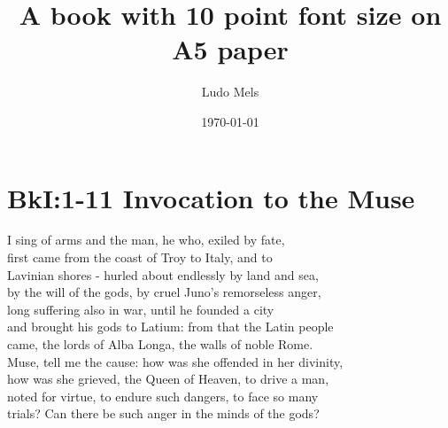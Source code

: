 \documentclass[10pt, a5paper, titlepage]{book}
\title{A book with 10 point font size on A5 paper}
\author{Ludo Mels}
\date{\today}
\begin{document}
\maketitle
\newpage
\section*{BkI:1-11 Invocation to the Muse}
I sing of arms and the man, he who, exiled by fate,\\
first came from the coast of Troy to Italy, and to\\
Lavinian shores - hurled about endlessly by land and sea,\\
by the will of the gods, by cruel Juno's remorseless anger,\\
long suffering also in war, until he founded a city\\
and brought his gods to Latium: from that the Latin people\\
came, the lords of Alba Longa, the walls of noble Rome.\\
Muse, tell me the cause: how was she offended in her divinity,\\
how was she grieved, the Queen of Heaven, to drive a man,\\
noted for virtue, to endure such dangers, to face so many\\
trials? Can there be such anger in the minds of the gods?

\end{document}
